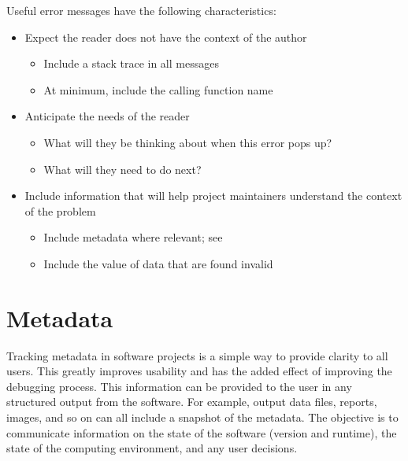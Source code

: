 \documentclass[]{nlr}
\begin{document}
Useful error messages have the following characteristics:
\begin{itemize}

\item Expect the reader does not have the context of the author
\begin{itemize}
\item Include a stack trace in all messages
\item At minimum, include the calling function name
\end{itemize}

\item Anticipate the needs of the reader
\begin{itemize}
\item What will they be thinking about when this error pops up?
\item What will they need to do next?
\end{itemize}

\item Include information that will help project maintainers understand the context of the problem
\begin{itemize}
\item Include metadata where relevant; see 
\item Include the value of data that are found invalid
\end{itemize}

\end{itemize}


\section{Metadata}
\label{sec:metadata}
Tracking metadata in software projects is a simple way to provide clarity to all users.
This greatly improves usability and has the added effect of improving the debugging process.
This information can be provided to the user in any structured output from the software.
For example, output data files, reports, images, and so on can all include a snapshot of the metadata.
The objective is to communicate information on the state of the software (version and runtime),
the state of the computing environment, and any user decisions.
\end{document}
